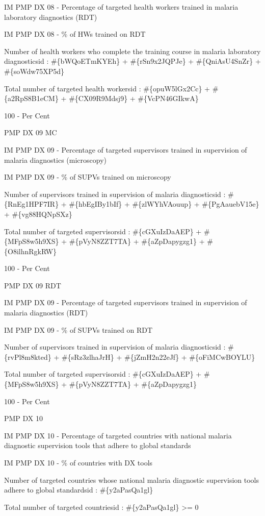 \documentclass[]{book}
\begin{document}
IM PMP DX 08 - Percentage of targeted health workers trained in malaria laboratory diagnostics (RDT)

IM PMP DX 08 - \% of HWs trained on RDT

Number of health workers who complete the training course in malaria laboratory diagnosticsid : \#\{bWQoETmKYEh\} + \#\{rSn9x2JQPJe\} + \#\{QniAsU4SnZr\} + \#\{soWdw75XP5d\}

Total number of targeted health workersid : \#\{opuW5lGx2Cc\} + \#\{a2RpS8B1eCM\} + \#\{CX09R9Mdsj9\} + \#\{VcPN46GIkwA\}

100 - Per Cent

PMP DX 09 MC

IM PMP DX 09 - Percentage of targeted supervisors trained in supervision of malaria diagnostics (microscopy)

IM PMP DX 09 - \% of SUPVs trained on microscopy

Number of supervisors trained in supervision of malaria diagnosticsid : \#\{RnEg1HPF7IR\} + \#\{hbEgIBy1bIf\} + \#\{zlWYhVAouup\} + \#\{PgAauebV15e\} + \#\{vg88HQNpSXz\}

Total number of targeted supervisorsid : \#\{cGXuIzDaAEP\} + \#\{MFpS8w5h9XS\} + \#\{pVyN8ZZT7TA\} + \#\{aZpDapygzg1\} + \#\{O8ilhnRgkRW\}

100 - Per Cent

PMP DX 09 RDT

IM PMP DX 09 - Percentage of targeted supervisors trained in supervision of malaria diagnostics (RDT)

IM PMP DX 09 - \% of SUPVs trained on RDT

Number of supervisors trained in supervision of malaria diagnosticsid : \#\{rvPl8m8kted\} + \#\{sRz3zlhaJrH\} + \#\{jZmH2n22eJf\} + \#\{oFiMCwBOYLU\}

Total number of targeted supervisorsid : \#\{cGXuIzDaAEP\} + \#\{MFpS8w5h9XS\} + \#\{pVyN8ZZT7TA\} + \#\{aZpDapygzg1\}

100 - Per Cent

PMP DX 10

IM PMP DX 10 - Percentage of targeted countries with national malaria diagnostic supervision tools that adhere to global standards

IM PMP DX 10 - \% of countries with DX tools

Number of targeted countries whose national malaria diagnostic supervision tools adhere to global standardsid : \#\{y2aPasQa1gl\}

Total number of targeted countriesid : \#\{y2aPasQa1gl\} \textgreater{}= 0
\end{document}
